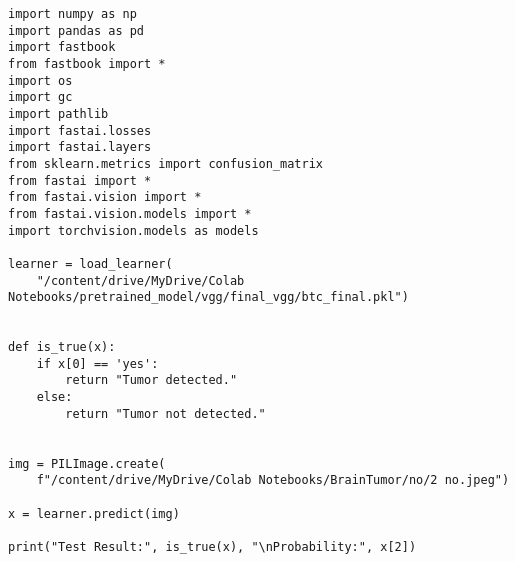 \begin{verbatim}
import numpy as np
import pandas as pd
import fastbook
from fastbook import *
import os
import gc
import pathlib
import fastai.losses
import fastai.layers
from sklearn.metrics import confusion_matrix
from fastai import *
from fastai.vision import *
from fastai.vision.models import *
import torchvision.models as models

learner = load_learner(
    "/content/drive/MyDrive/Colab Notebooks/pretrained_model/vgg/final_vgg/btc_final.pkl")


def is_true(x):
    if x[0] == 'yes':
        return "Tumor detected."
    else:
        return "Tumor not detected."


img = PILImage.create(
    f"/content/drive/MyDrive/Colab Notebooks/BrainTumor/no/2 no.jpeg")

x = learner.predict(img)

print("Test Result:", is_true(x), "\nProbability:", x[2])
\end{verbatim}
